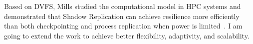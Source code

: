 Based on DVFS, Mills studied the computational model in HPC systems and  
demonstrated that Shadow Replication can achieve resilience more efficiently than both checkpointing and process replication when power is limited~\cite{mills_2014_icnc,mills_2014_pdp,mills2014power}.
I am going to extend the work to achieve better flexibility, adaptivity, and scalability. 



